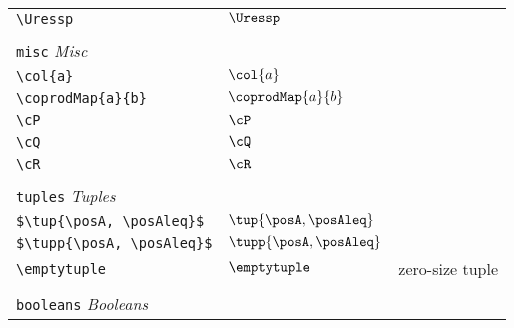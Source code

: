 \begin{longtable}{lll}
  {\color[rgb]{0.5,0.5,0.5}\texttt{\textbackslash Uressp}}                                                  & $\Uressp$                  &                                                         \\
  &                            &                                                         \\
  \multicolumn{3}{l}{{\color[rgb]{0.5,0.5,0.5}\texttt{misc}} \emph{Misc}} \\
  \hline
  \hline
  {\color[rgb]{0.5,0.5,0.5}\texttt{\textbackslash col\{a\}}}                                                & $\col{a}$                  & \\
  {\color[rgb]{0.5,0.5,0.5}\texttt{\textbackslash coprodMap\{a\}\{b\}}}                                     & $\coprodMap{a}{b}$
  & \\
  {\color[rgb]{0.5,0.5,0.5}\texttt{\textbackslash cP}}                                                      & $\cP$                      & \\
  {\color[rgb]{0.5,0.5,0.5}\texttt{\textbackslash cQ}}                                                      & $\cQ$                      & \\
  {\color[rgb]{0.5,0.5,0.5}\texttt{\textbackslash cR}}                                                      & $\cR$                      &                                                         \\
  &                            &                                                         \\
  \multicolumn{3}{l}{{\color[rgb]{0.5,0.5,0.5}\texttt{tuples}} \emph{Tuples}} \\
  \hline
  \hline
  {\color[rgb]{0.5,0.5,0.5}\texttt{\$\textbackslash tup\{\textbackslash posA, \textbackslash posAleq\}\$}}
  & $\tup{\posA, \posAleq}$
  & \\
  {\color[rgb]{0.5,0.5,0.5}\texttt{\$\textbackslash tupp\{\textbackslash posA, \textbackslash posAleq\}\$}}
  & $\tupp{\posA, \posAleq}$
  & \\
  {\color[rgb]{0.5,0.5,0.5}\texttt{\textbackslash emptytuple}}                                              & $\emptytuple$              & zero-size tuple                                         \\
  &                            &                                                         \\
  \multicolumn{3}{l}{{\color[rgb]{0.5,0.5,0.5}\texttt{booleans}} \emph{Booleans}} \\
  \hline

\end{longtable}
